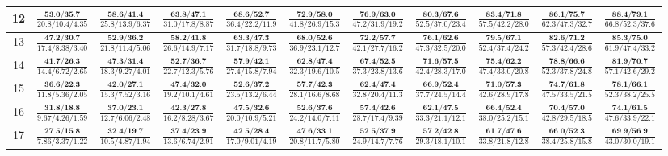 \documentclass{slides}
\begin{document}
{{{\begin{tabular}{|c|c|c|c|c|c|c|c|c|c|c|}
\hline
12 & $\frac{\textbf{53.0/35.7}}{20.8/10.4/4.35}$ & $\frac{\textbf{58.6/41.4}}{25.8/13.9/6.37}$ & $\frac{\textbf{63.8/47.1}}{31.0/17.8/8.87}$ & $\frac{\textbf{68.6/52.7}}{36.4/22.2/11.9}$ & $\frac{\textbf{72.9/58.0}}{41.8/26.9/15.3}$ & $\frac{\textbf{76.9/63.0}}{47.2/31.9/19.2}$ & $\frac{\textbf{80.3/67.6}}{52.5/37.0/23.4}$ & $\frac{\textbf{83.4/71.8}}{57.5/42.2/28.0}$ & $\frac{\textbf{86.1/75.7}}{62.3/47.3/32.7}$ & $\frac{\textbf{88.4/79.1}}{66.8/52.3/37.6}$ \\
\hline
13 & $\frac{\textbf{47.2/30.7}}{17.4/8.38/3.40}$ & $\frac{\textbf{52.9/36.2}}{21.8/11.4/5.06}$ & $\frac{\textbf{58.2/41.8}}{26.6/14.9/7.17}$ & $\frac{\textbf{63.3/47.3}}{31.7/18.8/9.73}$ & $\frac{\textbf{68.0/52.6}}{36.9/23.1/12.7}$ & $\frac{\textbf{72.2/57.7}}{42.1/27.7/16.2}$ & $\frac{\textbf{76.1/62.6}}{47.3/32.5/20.0}$ & $\frac{\textbf{79.5/67.1}}{52.4/37.4/24.2}$ & $\frac{\textbf{82.6/71.2}}{57.3/42.4/28.6}$ & $\frac{\textbf{85.3/75.0}}{61.9/47.4/33.2}$ \\
\hline
14 & $\frac{\textbf{41.7/26.3}}{14.4/6.72/2.65}$ & $\frac{\textbf{47.3/31.4}}{18.3/9.27/4.01}$ & $\frac{\textbf{52.7/36.7}}{22.7/12.3/5.76}$ & $\frac{\textbf{57.9/42.1}}{27.4/15.8/7.94}$ & $\frac{\textbf{62.8/47.4}}{32.3/19.6/10.5}$ & $\frac{\textbf{67.4/52.5}}{37.3/23.8/13.6}$ & $\frac{\textbf{71.6/57.5}}{42.4/28.3/17.0}$ & $\frac{\textbf{75.4/62.2}}{47.4/33.0/20.8}$ & $\frac{\textbf{78.8/66.6}}{52.3/37.8/24.8}$ & $\frac{\textbf{81.9/70.7}}{57.1/42.6/29.2}$ \\
\hline
15 & $\frac{\textbf{36.6/22.3}}{11.8/5.36/2.05}$ & $\frac{\textbf{42.0/27.1}}{15.3/7.52/3.16}$ & $\frac{\textbf{47.4/32.0}}{19.2/10.1/4.61}$ & $\frac{\textbf{52.6/37.2}}{23.5/13.2/6.44}$ & $\frac{\textbf{57.7/42.3}}{28.1/16.6/8.68}$ & $\frac{\textbf{62.4/47.4}}{32.8/20.4/11.3}$ & $\frac{\textbf{66.9/52.4}}{37.7/24.5/14.4}$ & $\frac{\textbf{71.0/57.3}}{42.6/28.9/17.8}$ & $\frac{\textbf{74.7/61.8}}{47.5/33.5/21.5}$ & $\frac{\textbf{78.1/66.1}}{52.3/38.2/25.5}$ \\
\hline
16 & $\frac{\textbf{31.8/18.8}}{9.67/4.26/1.59}$ & $\frac{\textbf{37.0/23.1}}{12.7/6.06/2.48}$ & $\frac{\textbf{42.3/27.8}}{16.2/8.28/3.67}$ & $\frac{\textbf{47.5/32.6}}{20.0/10.9/5.21}$ & $\frac{\textbf{52.6/37.6}}{24.2/14.0/7.11}$ & $\frac{\textbf{57.4/42.6}}{28.7/17.4/9.39}$ & $\frac{\textbf{62.1/47.5}}{33.3/21.1/12.1}$ & $\frac{\textbf{66.4/52.4}}{38.0/25.2/15.1}$ & $\frac{\textbf{70.4/57.0}}{42.8/29.5/18.5}$ & $\frac{\textbf{74.1/61.5}}{47.6/33.9/22.1}$ \\
\hline
17 & $\frac{\textbf{27.5/15.8}}{7.86/3.37/1.22}$ & $\frac{\textbf{32.4/19.7}}{10.5/4.87/1.94}$ & $\frac{\textbf{37.4/23.9}}{13.6/6.74/2.91}$ & $\frac{\textbf{42.5/28.4}}{17.0/9.01/4.19}$ & $\frac{\textbf{47.6/33.1}}{20.8/11.7/5.80}$ & $\frac{\textbf{52.5/37.9}}{24.9/14.7/7.76}$ & $\frac{\textbf{57.2/42.8}}{29.3/18.1/10.1}$ & $\frac{\textbf{61.7/47.6}}{33.8/21.8/12.8}$ & $\frac{\textbf{66.0/52.3}}{38.4/25.8/15.8}$ & $\frac{\textbf{69.9/56.9}}{43.0/30.0/19.1}$ \\

\end{tabular}}}}
\end{document}
